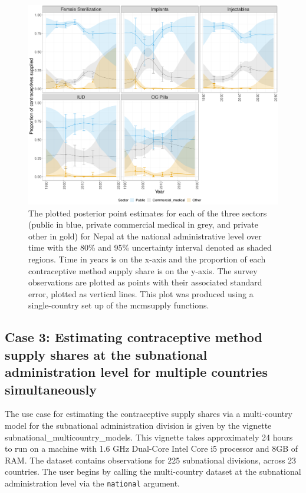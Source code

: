 \begin{figure}[H]
\includegraphics[width=1\linewidth,height=0.4\textheight]{figures/fig_4} \caption{The plotted posterior point estimates for each of the three sectors (public in blue, private commercial medical in grey, and private other in gold) for Nepal at the national administrative level over time with the 80\% and 95\% uncertainty interval denoted as shaded regions. Time in years is on the x-axis and the proportion of each contraceptive method supply share is on the y-axis. The survey observations are plotted as points with their associated standard error, plotted as vertical lines. This plot was produced using a single-country set up of the mcmsupply functions.}\label{fig:fig-4}
\end{figure}

\subsection{Case 3: Estimating contraceptive method supply shares at the subnational administration level for multiple countries simultaneously}\label{case-3-estimating-contraceptive-method-supply-shares-at-the-subnational-administration-level-for-multiple-countries-simultaneously}

The use case for estimating the contraceptive supply shares via a multi-country model for the subnational administration division is given by the vignette subnational\_multicountry\_models. This vignette takes approximately 24 hours to run on a machine with 1.6 GHz Dual-Core Intel Core i5 processor and 8GB of RAM. The dataset contains observations for 225 subnational divisions, across 23 countries. The user begins by calling the multi-country dataset at the subnational administration level via the \texttt{national} argument.

